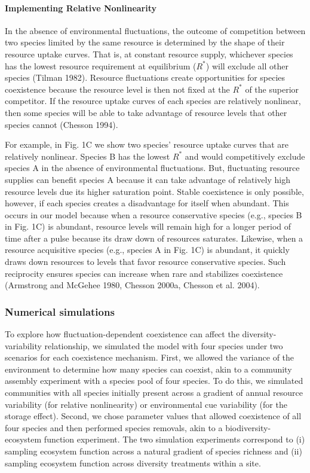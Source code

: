\documentclass[12pt,]{article}
\begin{document}
\paragraph{Implementing Relative
Nonlinearity}\label{implementing-relative-nonlinearity}

In the absence of environmental fluctuations, the outcome of competition
between two species limited by the same resource is determined by the
shape of their resource uptake curves. That is, at constant resource
supply, whichever species has the lowest resource requirement at
equilibrium (\(R^*\)) will exclude all other species (Tilman 1982).
Resource fluctuations create opportunities for species coexistence
because the resource level is then not fixed at the \(R^*\) of the
superior competitor. If the resource uptake curves of each species are
relatively nonlinear, then some species will be able to take advantage
of resource levels that other species cannot (Chesson 1994).

For example, in Fig. 1C we show two species' resource uptake curves that
are relatively nonlinear. Species B has the lowest \(R^*\) and would
competitively exclude species A in the absence of environmental
fluctuations. But, fluctuating resource supplies can benefit species A
because it can take advantage of relatively high resource levels due its
higher saturation point. Stable coexistence is only possible, however,
if each species creates a disadvantage for itself when abundant. This
occurs in our model because when a resource conservative species (e.g.,
species B in Fig. 1C) is abundant, resource levels will remain high for
a longer period of time after a pulse because its draw down of resources
saturates. Likewise, when a resource acquisitive species (e.g., species
A in Fig. 1C) is abundant, it quickly draws down resources to levels
that favor resource conservative species. Such reciprocity ensures
species can increase when rare and stabilizes coexistence (Armstrong and
McGehee 1980, Chesson 2000a, Chesson et al. 2004).

\subsubsection{Numerical simulations}\label{numerical-simulations}

To explore how fluctuation-dependent coexistence can affect the
diversity-variability relationship, we simulated the model with four
species under two scenarios for each coexistence mechanism. First, we
allowed the variance of the environment to determine how many species
can coexist, akin to a community assembly experiment with a species pool
of four species. To do this, we simulated communities with all species
initially present across a gradient of annual resource variability (for
relative nonlinearity) or environmental cue variability (for the storage
effect). Second, we chose parameter values that allowed coexistence of
all four species and then performed species removals, akin to a
biodiversity-ecosystem function experiment. The two simulation
experiments correspond to (i) sampling ecosystem function across a
natural gradient of species richness and (ii) sampling ecosystem
function across diversity treatments within a site.
\end{document}
